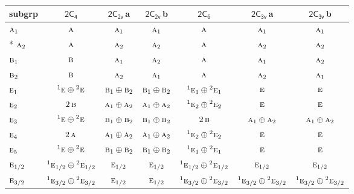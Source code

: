 \documentclass[10pt,a4paper]{article}
\numberwithin{equation}{section}
\newcommand{\grp}[1]{\mathsf{#1}}
\newcommand{\irr}[1]{\text{\normalfont\scshape #1}}
\newcommand{\conjpair}[1]{{}^{#1}}
\newcommand{\clsletter}[1]{\,{\scriptsize\color{black!55}#1}}
\begin{document}
{\small\begin{longtable}{@{}lcccccc@{}}\toprule
subgrp & \href{2C4.pdf}{$\grp{2C_{4}}$} & \href{2C2v.pdf}{$\grp{2C_{2v}}$}\clsletter{a} & \href{2C2v.pdf}{$\grp{2C_{2v}}$}\clsletter{b} & \href{2C6.pdf}{$\grp{2C_{6}}$} & \href{2C3v.pdf}{$\grp{2C_{3v}}$}\clsletter{a} & \href{2C3v.pdf}{$\grp{2C_{3v}}$}\clsletter{b}\\\midrule\endhead
\bottomrule\endfoot\endlastfoot
$\irr{a}_{1}$ & $\irr{a}$ & $\irr{a}_{1}$ & $\irr{a}_{1}$ & $\irr{a}$ & $\irr{a}_{1}$ & $\irr{a}_{1}$\\*
$\irr{a}_{2}$ & $\irr{a}$ & $\irr{a}_{2}$ & $\irr{a}_{2}$ & $\irr{a}$ & $\irr{a}_{2}$ & $\irr{a}_{2}$\\
$\irr{b}_{1}$ & $\irr{b}$ & $\irr{a}_{1}$ & $\irr{a}_{2}$ & $\irr{a}$ & $\irr{a}_{1}$ & $\irr{a}_{2}$\\
$\irr{b}_{2}$ & $\irr{b}$ & $\irr{a}_{2}$ & $\irr{a}_{1}$ & $\irr{a}$ & $\irr{a}_{2}$ & $\irr{a}_{1}$\\
$\irr{e}_{1}$ & $\conjpair{1}\irr{e}\oplus \conjpair{2}\irr{e}$ & $\irr{b}_{1}\oplus \irr{b}_{2}$ & $\irr{b}_{1}\oplus \irr{b}_{2}$ & $\conjpair{1}\irr{e}_{1}\oplus \conjpair{2}\irr{e}_{1}$ & $\irr{e}$ & $\irr{e}$\\
$\irr{e}_{2}$ & $2\,\irr{b}$ & $\irr{a}_{1}\oplus \irr{a}_{2}$ & $\irr{a}_{1}\oplus \irr{a}_{2}$ & $\conjpair{1}\irr{e}_{2}\oplus \conjpair{2}\irr{e}_{2}$ & $\irr{e}$ & $\irr{e}$\\
$\irr{e}_{3}$ & $\conjpair{1}\irr{e}\oplus \conjpair{2}\irr{e}$ & $\irr{b}_{1}\oplus \irr{b}_{2}$ & $\irr{b}_{1}\oplus \irr{b}_{2}$ & $2\,\irr{b}$ & $\irr{a}_{1}\oplus \irr{a}_{2}$ & $\irr{a}_{1}\oplus \irr{a}_{2}$\\
$\irr{e}_{4}$ & $2\,\irr{a}$ & $\irr{a}_{1}\oplus \irr{a}_{2}$ & $\irr{a}_{1}\oplus \irr{a}_{2}$ & $\conjpair{1}\irr{e}_{2}\oplus \conjpair{2}\irr{e}_{2}$ & $\irr{e}$ & $\irr{e}$\\
$\irr{e}_{5}$ & $\conjpair{1}\irr{e}\oplus \conjpair{2}\irr{e}$ & $\irr{b}_{1}\oplus \irr{b}_{2}$ & $\irr{b}_{1}\oplus \irr{b}_{2}$ & $\conjpair{1}\irr{e}_{1}\oplus \conjpair{2}\irr{e}_{1}$ & $\irr{e}$ & $\irr{e}$\\
$\irr{e}_{1/2}$ & $\conjpair{1}\irr{e}_{1/2}\oplus \conjpair{2}\irr{e}_{1/2}$ & $\irr{e}_{1/2}$ & $\irr{e}_{1/2}$ & $\conjpair{1}\irr{e}_{1/2}\oplus \conjpair{2}\irr{e}_{1/2}$ & $\irr{e}_{1/2}$ & $\irr{e}_{1/2}$\\
$\irr{e}_{3/2}$ & $\conjpair{1}\irr{e}_{3/2}\oplus \conjpair{2}\irr{e}_{3/2}$ & $\irr{e}_{1/2}$ & $\irr{e}_{1/2}$ & $\conjpair{1}\irr{e}_{3/2}\oplus \conjpair{2}\irr{e}_{3/2}$ & $\conjpair{1}\irr{e}_{3/2}\oplus \conjpair{2}\irr{e}_{3/2}$ & $\conjpair{1}\irr{e}_{3/2}\oplus \conjpair{2}\irr{e}_{3/2}$\\

\end{longtable}}
\end{document}
